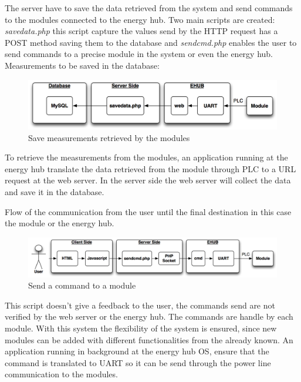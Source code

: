 The server have to save the data retrieved from the system and send commands to the modules connected to the energy hub. Two main scripts are created: \textit{savedata.php} this script capture the values send by the HTTP request has a POST method saving them to the database and \textit{sendcmd.php} enables the user to send commands to a precise module in the system or even the energy hub.
\newpage
Measurements to be saved in the database:
\begin{figure}[H]
	\begin{centering}
		\includegraphics[width=1\textwidth]{images/tb6_webserver_savedata.png}
		\caption{Save measurements retrieved by the modules}
	\end{centering}
\end{figure}
To retrieve the measurements from the modules, an application running at the energy hub translate the data retrieved from the module through PLC to a URL request at the web server. In the server side the web server will collect the data and save it in the database.

Flow of the communication from the user until the final destination in this case the module or the energy hub.
\begin{figure}[H]
	\begin{centering}
		\includegraphics[width=1\textwidth]{images/tb6_webserver_sendcmd.png}
		\caption{Send a command to a module}
	\end{centering}
\end{figure}
This script doesn't give a feedback to the user, the commands send are not verified by the web server or the energy hub. The commands are handle by each module. With this system the flexibility of the system is ensured, since new modules can be added with different functionalities from the already known.
An application running in background at the energy hub OS, ensure that the command is translated to UART so it can be send through the power line communication to the modules.
\\


